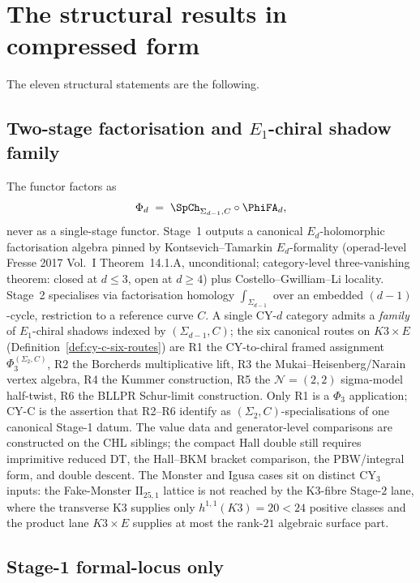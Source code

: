 \section{The structural results in compressed form}
\label{sec:v3-intro-structural-results}

The eleven structural statements are the following.

\subsection{Two-stage factorisation and \texorpdfstring{$E_1$-chiral}{E1-chiral} shadow family}
\label{subsec:v3-intro-two-stage}

The functor factors as
\[
 \Phi_d \;=\; \SpCh_{\Sigma_{d-1},C}\circ\PhiFA_d,
\]
never as a single-stage functor. Stage~1 outputs a canonical
$E_d$-holomorphic factorisation algebra pinned by Kontsevich--Tamarkin
$E_d$-formality (operad-level Fresse 2017 Vol.~I Theorem~14.1.A,
unconditional; category-level three-vanishing theorem: closed at
$d\le 3$, open at $d\ge 4$) plus Costello--Gwilliam--Li locality.
Stage~2 specialises via factorisation homology
$\int_{\Sigma_{d-1}}$ over an embedded $(d-1)$-cycle, restriction to a
reference curve $C$. A single CY-$d$ category admits a \emph{family} of $E_1$-chiral
shadows indexed by $(\Sigma_{d-1},C)$; the six canonical routes on
$K3\times E$ (Definition~\ref{def:cy-c-six-routes}) are R1 the
CY-to-chiral framed assignment $\Phi_3^{(\Sigma_2,C)}$, R2 the
Borcherds multiplicative lift, R3 the Mukai--Heisenberg/Narain vertex algebra, R4 the
Kummer construction, R5 the $\mathcal N=(2,2)$ sigma-model half-twist,
R6 the BLLPR Schur-limit construction. Only R1 is a $\Phi_3$
application; CY-C is the assertion that R2--R6 identify as
$(\Sigma_2, C)$-specialisations of one canonical Stage-1 datum. The
value data and generator-level comparisons are constructed on the
CHL siblings; the compact Hall double still requires imprimitive
reduced DT, the Hall--BKM bracket comparison, the PBW/integral form,
and double descent. The Monster and Igusa cases sit on distinct
CY$_3$ inputs: the Fake-Monster $\mathrm{II}_{25,1}$ lattice is not
reached by the K3-fibre Stage-$2$ lane, where the transverse K3
supplies only $h^{1,1}(K3)=20<24$ positive classes and the product
lane $K3\times E$ supplies at most the rank-$21$ algebraic surface
part.

\subsection{Stage-1 formal-locus only}
\label{subsec:v3-intro-stage1-formal-locus}

